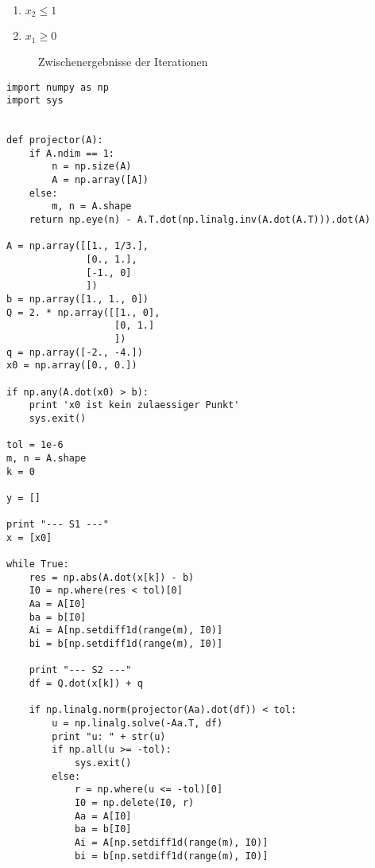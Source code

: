 \begin{exmp}
\begin{minipage}[c]{0.5\textwidth}
\begin{enumerate}[label=(\arabic*)]
  \item $x_2\le 1$
  \item $x_1 \ge 0$ 
\end{enumerate}
\end{minipage}
\hfill
\begin{minipage}[c]{0.5\textwidth}
\centering

\end{minipage}
\begin{figure}[!htb]
	\centering
	
	\caption{Zwischenergebnisse der Iterationen}
	\label{fig:kap_1_example_active_set_ews}
\end{figure}
\begin{lstlisting}[style=PythonStyle, caption=Anwendung Aktive Mengen Algorithmus für \exmpref{exmp:kap_1_ama}, label=code:kap_1_active_set] 
import numpy as np
import sys


def projector(A):
    if A.ndim == 1:
        n = np.size(A)
        A = np.array([A])
    else:
        m, n = A.shape
    return np.eye(n) - A.T.dot(np.linalg.inv(A.dot(A.T))).dot(A)

A = np.array([[1., 1/3.],
              [0., 1.],
              [-1., 0]
              ])
b = np.array([1., 1., 0])
Q = 2. * np.array([[1., 0],
                   [0, 1.]
                   ])
q = np.array([-2., -4.])
x0 = np.array([0., 0.])

if np.any(A.dot(x0) > b):
    print 'x0 ist kein zulaessiger Punkt'
    sys.exit()

tol = 1e-6
m, n = A.shape
k = 0

y = []

print "--- S1 ---"
x = [x0]

while True:
    res = np.abs(A.dot(x[k]) - b)
    I0 = np.where(res < tol)[0]
    Aa = A[I0]
    ba = b[I0]
    Ai = A[np.setdiff1d(range(m), I0)]
    bi = b[np.setdiff1d(range(m), I0)]

    print "--- S2 ---"
    df = Q.dot(x[k]) + q

    if np.linalg.norm(projector(Aa).dot(df)) < tol:
        u = np.linalg.solve(-Aa.T, df)
        print "u: " + str(u)
        if np.all(u >= -tol):
            sys.exit()
        else:
            r = np.where(u <= -tol)[0]
            I0 = np.delete(I0, r)
            Aa = A[I0]
            ba = b[I0]
            Ai = A[np.setdiff1d(range(m), I0)]
            bi = b[np.setdiff1d(range(m), I0)]


\end{lstlisting}
\end{exmp}
